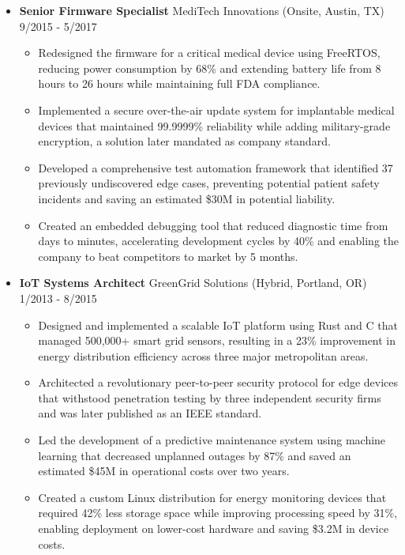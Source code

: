 \documentclass[11pt]{article}
\begin{document}
\begin{itemize}[noitemsep, topsep=0pt, itemsep=1.5em, label=]
\item \textbf{Senior Firmware Specialist} \textperiodcentered MediTech Innovations (Onsite, Austin, TX) \hfill 9/2015 - 5/2017
\begin{itemize}[label=›, noitemsep, topsep=0pt, leftmargin=1em]
	\item Redesigned the firmware for a critical medical device using FreeRTOS, reducing power consumption by 68\% and extending battery life from 8 hours to 26 hours while maintaining full FDA compliance.
	\item Implemented a secure over-the-air update system for implantable medical devices that maintained 99.9999\% reliability while adding military-grade encryption, a solution later mandated as company standard.
	\item Developed a comprehensive test automation framework that identified 37 previously undiscovered edge cases, preventing potential patient safety incidents and saving an estimated \$30M in potential liability.
	\item Created an embedded debugging tool that reduced diagnostic time from days to minutes, accelerating development cycles by 40\% and enabling the company to beat competitors to market by 5 months.
\end{itemize}

\item \textbf{IoT Systems Architect} \textperiodcentered GreenGrid Solutions (Hybrid, Portland, OR) \hfill 1/2013 - 8/2015
\begin{itemize}[label=›, noitemsep, topsep=0pt, leftmargin=1em]
	\item Designed and implemented a scalable IoT platform using Rust and C that managed 500,000+ smart grid sensors, resulting in a 23\% improvement in energy distribution efficiency across three major metropolitan areas.
	\item Architected a revolutionary peer-to-peer security protocol for edge devices that withstood penetration testing by three independent security firms and was later published as an IEEE standard.
	\item Led the development of a predictive maintenance system using machine learning that decreased unplanned outages by 87\% and saved an estimated \$45M in operational costs over two years.
	\item Created a custom Linux distribution for energy monitoring devices that required 42\% less storage space while improving processing speed by 31\%, enabling deployment on lower-cost hardware and saving \$3.2M in device costs.
\end{itemize}
\end{itemize}
\end{document}
